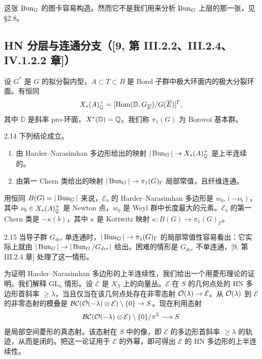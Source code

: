 这张 $\operatorname{Bun}_G$ 的图卡容易构造。然而它不是我们用来分析 $\operatorname{Bun}_G$ 上层的那一张，见 §2.8。

\subsection{HN 分层与连通分支（[9, 第 III.2.2、III.2.4、IV.1.2.2 章]）}

设 $G^*$ 是 $G$ 的拟分裂内型，$A\subset T\subset B$ 是 Borel 子群中极大环面内的极大分裂环面。有恒同
\[
X_*(A)^+_{\mathbb{Q}}=[\mathrm{Hom}(\mathbb D,G_{\overline E})/G(\overline E)]^\Gamma,
\]
其中 $\mathbb D$ 是斜率 pro-环面，$X^*(\mathbb D)=\mathbb{Q}$。我们称 $\pi_1(G)$ 为 Borovoi 基本群。

\begin{thm}{2.14}
下列结论成立。
\begin{enumerate}[label=(\arabic*),leftmargin=2.2em,itemsep=0.2em]
\item 由 Harder–Narasimhan 多边形给出的映射 $|\operatorname{Bun}_G|\to X_*(A)^+_{\mathbb{Q}}$ 是上半连续的。
\item 由第一 Chern 类给出的映射 $|\operatorname{Bun}_G|\to\pi_1(G)_\Gamma$ 局部常值，且纤维连通。
\end{enumerate}
\label{thm:a3-2-14}
\end{thm}

用恒同 $B(G)=|\operatorname{Bun}_G|$ 来说，$\mathcal E_b$ 的 Harder–Narasimhan 多边形是 $w_0.(-\nu_b)$，其中 $\nu_b\in X_*(A)^+_{\mathbb{Q}}$ 是 Newton 点，$w_0$ 是 Weyl 群中长度最大的元素。$\mathcal E_b$ 的第一 Chern 类是 $-\kappa(b)$，其中 $\kappa$ 是 Kottwitz 映射 $\kappa:B(G)\to\pi_1(G)_\Gamma$。

\begin{rem}{2.15}
当导子群 $G_{der}$ 单连通时，$|\operatorname{Bun}_G|\to\pi_1(G)_\Gamma$ 的局部常值性容易看出：它实际上就由 $|\operatorname{Bun}_G|\to|\operatorname{Bun}_G/G_{der}|$ 给出。困难的情形是 $G_{der}$ 不单连通，[9, 第 III.2.4 章] 处理了这一情形。
\label{rem:a3-2-15}
\end{rem}

为证明 Harder–Narasimhan 多边形的上半连续性，我们给出一个用菱形理论的证明。我们解释 $\mathrm{GL}_n$ 情形。设 $\mathcal E$ 是 $X_S$ 上的向量丛。$\mathcal E$ 在 $S$ 的几何点处的 HN 多边形首斜率 $\ge\lambda$，当且仅当在该几何点处存在非零态射 $\mathcal{O}(\lambda)\to\mathcal E$。从 $\mathcal{O}(\lambda)$ 到 $\mathcal E$ 的非零态射的模叠是 $\mathcal{BC}(\mathcal{O}(-\lambda)\otimes\mathcal E)\setminus\{0\}\to S$。现在利用态射
\[
\mathcal{BC}(\mathcal{O}(-\lambda)\otimes\mathcal E)\setminus\{0\}/\pi^{\mathbb{Z}}\longrightarrow S
\]
是局部空间菱形的真态射。该态射在 $S$ 中的像，即 $\mathcal E$ 的多边形首斜率 $\ge\lambda$ 的轨迹，从而是闭的。把这一论证用于 $\mathcal E$ 的外幂，即可得出 $\mathcal E$ 的 HN 多边形的上半连续性。

